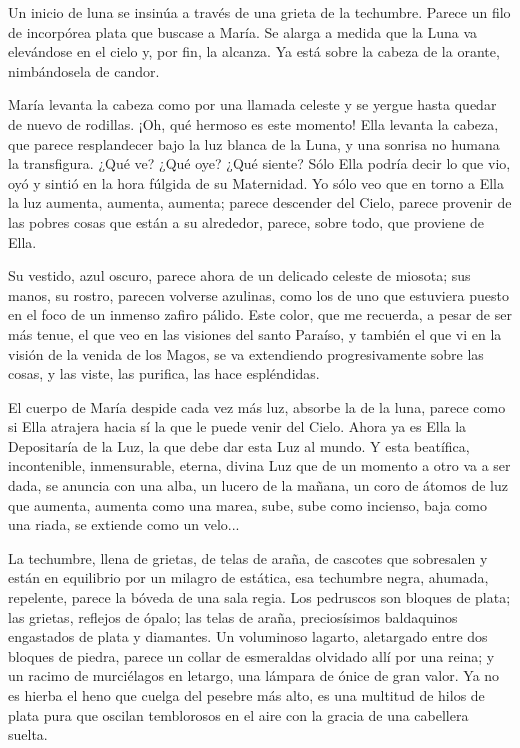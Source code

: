 \documentclass[12pt, twoside, openright]{book} %
\begin{document}
Un inicio de luna se insinúa a través de una grieta de la techumbre. Parece un filo de incorpórea plata que buscase a María. Se alarga a medida que la Luna va elevándose en el cielo y, por fin, la alcanza. Ya está sobre la cabeza de la orante, nimbándosela de candor. 

María levanta la cabeza como por una llamada celeste y se yergue hasta quedar de nuevo de rodillas. ¡Oh, qué hermoso es este momento! Ella levanta la cabeza, que parece resplandecer bajo la luz blanca de la Luna, y una sonrisa no humana la transfigura. ¿Qué ve? ¿Qué oye? ¿Qué siente? Sólo Ella podría decir lo que vio, oyó y sintió en la hora fúlgida de su Maternidad. Yo sólo veo que en torno a Ella la luz aumenta, aumenta, aumenta; parece descender del Cielo, parece provenir de las pobres cosas que están a su alrededor, parece, sobre todo, que proviene de Ella. 

Su vestido, azul oscuro, parece ahora de un delicado celeste de miosota; sus manos, su rostro, parecen volverse azulinas, como los de uno que estuviera puesto en el foco de un inmenso zafiro pálido. Este color, que me recuerda, a pesar de ser más tenue, el que veo en las visiones del santo Paraíso, y también el que vi en la visión de la venida de los Magos, se va extendiendo progresivamente sobre las cosas, y las viste, las purifica, las hace espléndidas. 

El cuerpo de María despide cada vez más luz, absorbe la de la luna, parece como si Ella atrajera hacia sí la que le puede venir del Cielo. Ahora ya es Ella la Depositaría de la Luz, la que debe dar esta Luz al mundo. Y esta beatífica, incontenible, inmensurable, eterna, divina Luz que de un momento a otro va a ser dada, se anuncia con una alba, un lucero de la mañana, un coro de átomos de luz que aumenta, aumenta como una marea, sube, sube como incienso, baja como una riada, se extiende como un velo... 

La techumbre, llena de grietas, de telas de araña, de cascotes que sobresalen y están en equilibrio por un milagro de estática, esa techumbre negra, ahumada, repelente, parece la bóveda de una sala regia. Los pedruscos son bloques de plata; las grietas, reflejos de ópalo; las telas de araña, preciosísimos baldaquinos engastados de plata y diamantes. Un voluminoso lagarto, aletargado entre dos bloques de piedra, parece un collar de esmeraldas olvidado allí por una reina; y un racimo de murciélagos en letargo, una lámpara de ónice de gran valor. Ya no es hierba el heno que cuelga del pesebre más alto, es una multitud de hilos de plata pura que oscilan temblorosos en el aire con la gracia de una cabellera suelta. 
\end{document}
